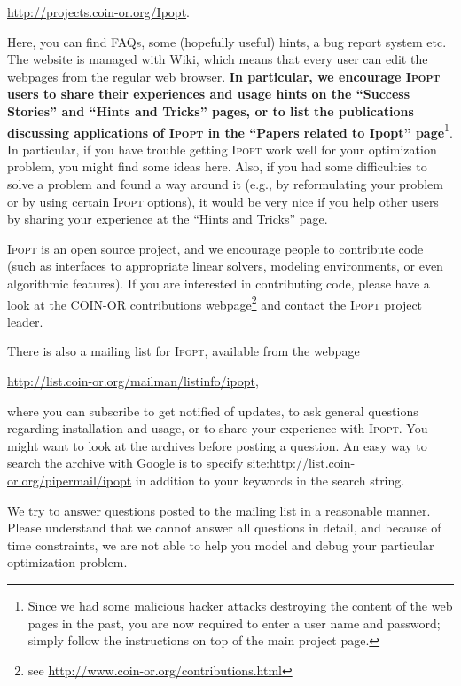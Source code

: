 \documentclass[10pt]{article}
\newcommand{\Ipopt}{\textsc{Ipopt}\xspace}
\begin{document}
\begin{center}
\url{http://projects.coin-or.org/Ipopt}.
\end{center}

Here, you can find FAQs, some (hopefully useful) hints, a bug report
system etc.  The website is managed with Wiki, which means that every
user can edit the webpages from the regular web browser.  {\bf In
  particular, we encourage \Ipopt users to share their experiences
  and usage hints on the ``Success Stories'' and ``Hints and Tricks''
  pages, or to list the publications discussing applications of
  \Ipopt in the ``Papers related to Ipopt'' page}\footnote{Since we
  had some malicious hacker attacks destroying the content of the web
  pages in the past, you are now required to enter a user name and
  password; simply follow the instructions on top of the main project
  page.}.  In particular, if you have trouble getting \Ipopt work
well for your optimization problem, you might find some ideas here.
Also, if you had some difficulties to solve a problem and found a way
around it (e.g., by reformulating your problem or by using certain
\Ipopt options), it would be very nice if you help other users by
sharing your experience at the ``Hints and Tricks'' page.

\Ipopt is an open source project, and we encourage people to
contribute code (such as interfaces to appropriate linear solvers,
modeling environments, or even algorithmic features).  If you are
interested in contributing code, please have a look at the COIN-OR
contributions webpage\footnote{see \url{http://www.coin-or.org/contributions.html}} and contact the \Ipopt
project leader.

There is also a mailing list for \Ipopt, available from the webpage
\begin{center}
\url{http://list.coin-or.org/mailman/listinfo/ipopt},
\end{center}
where you can subscribe to get notified of updates, to ask general
questions regarding installation and usage, or to share your
experience with \Ipopt. You might want to look at the archives before
posting a question.  An easy way to search the archive with Google is
to specify
\url{site:http://list.coin-or.org/pipermail/ipopt}
in addition to your keywords in the search string.

We try to answer questions posted to the mailing list in a reasonable
manner.  Please understand that we cannot answer all questions in
detail, and because of time constraints, we are not able to help
you model and debug your particular optimization problem.
\end{document}
